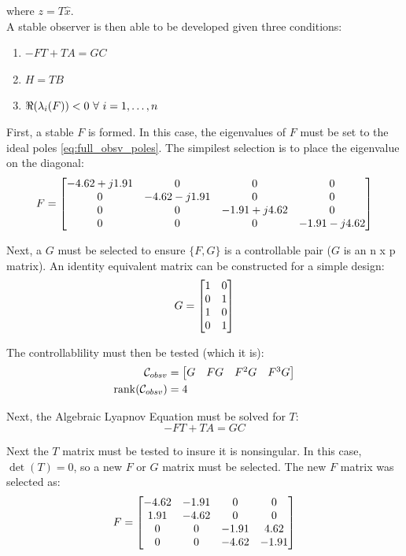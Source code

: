 \documentclass[]{article}
\newcommand{\ctrbl}{\mathcal{C}}
\begin{document}
 			where $z = T \hat{x}$.\\
 			
 			A stable observer is then able to be developed given three conditions:
 			\begin{enumerate}
 				\item $-FT + TA = GC$
 				\item $H = TB$
 				\item $\real(\lambda_i(F)) < 0 \ \forall \ i = 1,\dots,n$
 			\end{enumerate}
 			
 			First, a stable $F$ is formed. In this case, the eigenvalues of $F$ must be set to the ideal poles \eqref{eq:full_obsv_poles}. The simpilest selection is to place the eigenvalue on the diagonal:
 			\begin{equation}
 				F = \mqty[\dmat[0]{-4.62 + j 1.91, -4.62 - j 1.91, -1.91 + j 4.62, -1.91 - j 4.62}]
 			\end{equation}
 			
 			Next, a $G$ must be selected to ensure $\{F,G\}$ is a controllable pair ($G$ is an n x p matrix). An identity equivalent matrix can be constructed for a simple design:
 			\begin{equation}
 				G = \mqty[\imat{2}\\ \imat{2}]
 			\end{equation}
 			
 			The controllablility must then be tested (which it is):
 			\begin{equation}
 				\begin{aligned}
 					\ctrbl_{obsv} &= \mqty[G & FG & F^2G & F^3G]\\
 					\rank(\ctrbl_{obsv}) &= 4
 				\end{aligned}
 				\label{eq:obsv_ctrl_check}
 			\end{equation}
 		
 			Next, the Algebraic Lyapnov Equation must be solved for $T$:
 			\begin{equation}
 				-F T + T A = G C
 			\end{equation}
 			
 			Next the $T$ matrix must be tested to insure it is nonsingular. In this case, $\det(T) = 0$, so a new $F$ or $G$ matrix must be selected. The new $F$ matrix was selected as:
 			\begin{equation}
 				F = \mqty[-4.62   & -1.91   & 0                 & 0                 \\
 				1.91    & -4.62   & 0                 & 0                 \\
 				0                 & 0                 & -1.91   & 4.62    \\
 				0                 & 0                 & -4.62   & -1.91  ]
 			\end{equation}
 			
\end{document}

